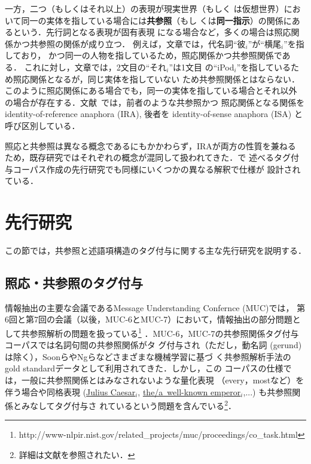 \documentclass[japanese]{jnlp_1.4}
\def\sec#1{}
\begin{document}
一方，二つ（もしくはそれ以上）の表現が現実世界（もしく
は仮想世界）において同一の実体を指している場合には\textbf{共参照}（もし
くは\textbf {同一指示}）の関係にあるという．先行詞となる表現が固有表現
になる場合など，多くの場合は照応関係かつ共参照の関係が成り立つ．
例えば，文章では，代名詞``彼$_i$''が``横尾$_i$''を指しており，
かつ同一の人物を指しているため，照応関係かつ共参照関係である．
これに対し，文章では，2文目の``それ$_i$''は1文目
の``iPod$_i$''を指しているため照応関係となるが，同じ実体を指していない
ため共参照関係とはならない．
このように照応関係にある場合でも，同一の実体を指している場合とそれ以外
の場合が存在する．文献~\cite{Mitkov:02}では，前者のような共参照かつ
照応関係となる関係をidentity-of-reference anaphora (IRA), 後者を
identity-of-sense anaphora (ISA) と呼び区別している．


照応と共参照は異なる概念であるにもかかわらず，IRAが両方の性質を兼ねる
ため，既存研究ではそれぞれの概念が混同して扱われてきた．\sec{third}で
述べるタグ付与コーパス作成の先行研究でも同様にいくつかの異なる解釈で仕様が
設計されている．




\section{先行研究}
\label{sec:third}

この節では，共参照と述語項構造のタグ付与に関する主な先行研究を説明する．


\subsection{照応・共参照のタグ付与}
\label{ssec:pre_coref}

情報抽出の主要な会議であるMessage Understanding Confernce (MUC)では，
第6回と第7回の会議（以後，MUC-6とMUC-7）において，情報抽出の部分問題と
して共参照解析の問題を扱っている\footnote{
    http://www-nlpir.nist.gov/related\_projects/muc/proceedings/co\_task.html}
．MUC-6，MUC-7の共参照関係タグ付与コーパスでは名詞句間の共参照関係がタ
グ付与され（ただし，動名詞 (gerund) は除く），Soonら\cite{Soon:01}やNgら\cite{Ng:02}などさまざまな機械学習に基づ
く共参照解析手法のgold standardデータとして利用されてきた．しかし，この
コーパスの仕様では，一般に共参照関係とはみなされないような量化表現
（every，mostなど）を伴う場合や同格表現 (\ul{Julius Caesar}$_i$,
\ul{\mbox{the/a well-known} \mbox{emperor}}$_i$,...) も共参照関係とみなしてタグ付与さ
れているという問題を含んでいる\footnote{詳細は文献\cite{Deemter:99}を参照されたい．}．
\end{document}
